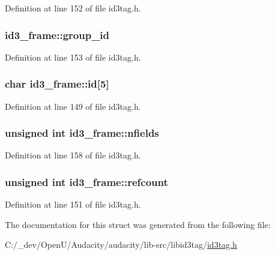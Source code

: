 Definition at line 152 of file id3tag.\+h.

\subsubsection[{\texorpdfstring{group\+\_\+id}{group_id}}]{ id3\+\_\+frame\+::group\+\_\+id}\hypertarget{structid3__frame_a5f1a46bcf4f0c8011c0cfb7d84b40322}{}\label{structid3__frame_a5f1a46bcf4f0c8011c0cfb7d84b40322}


Definition at line 153 of file id3tag.\+h.

\subsubsection[{\texorpdfstring{id}{id}}]{\setlength{\rightskip}{0pt plus 5cm}char id3\+\_\+frame\+::id\mbox{[}5\mbox{]}}\hypertarget{structid3__frame_afba4301780c29934e1d0cf5519bfbfd4}{}\label{structid3__frame_afba4301780c29934e1d0cf5519bfbfd4}


Definition at line 149 of file id3tag.\+h.

\subsubsection[{\texorpdfstring{nfields}{nfields}}]{\setlength{\rightskip}{0pt plus 5cm}unsigned {\bf int} id3\+\_\+frame\+::nfields}\hypertarget{structid3__frame_ae88162f41fc338aba7838d928118d282}{}\label{structid3__frame_ae88162f41fc338aba7838d928118d282}


Definition at line 158 of file id3tag.\+h.

\subsubsection[{\texorpdfstring{refcount}{refcount}}]{\setlength{\rightskip}{0pt plus 5cm}unsigned {\bf int} id3\+\_\+frame\+::refcount}\hypertarget{structid3__frame_aade8349eb17f0380c9ab8fd8bd6fad78}{}\label{structid3__frame_aade8349eb17f0380c9ab8fd8bd6fad78}


Definition at line 151 of file id3tag.\+h.



The documentation for this struct was generated from the following file\+:\begin{DoxyCompactItemize}
\item 
C\+:/\+\_\+dev/\+Open\+U/\+Audacity/audacity/lib-\/src/libid3tag/\hyperlink{id3tag_8h}{id3tag.\+h}\end{DoxyCompactItemize}
